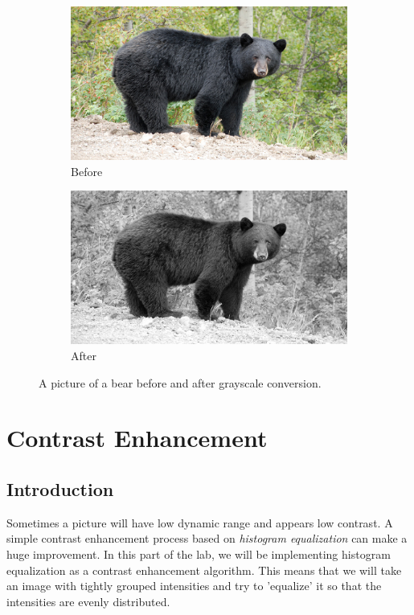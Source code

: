 \documentclass[11pt,a4paper]{article}
\begin{document}
\begin{figure}[ht]
	\centering
	\begin{subfigure}[h]{0.45\textwidth}
		\includegraphics[width=\textwidth]{images/test02}
		\caption{Before}
		\label{fig:gray2_bef}
	\end{subfigure}
	\begin{subfigure}[h]{0.45\textwidth}
		\includegraphics[width=\textwidth]{figs/test02_gray}
		\caption{After}
		\label{fig:gray2_aft}
	\end{subfigure}
	\caption{A picture of a bear before and after grayscale conversion.}
	\label{fig:gray2}
\end{figure}

\clearpage

\section{Contrast Enhancement}

\subsection{Introduction}
Sometimes a picture will have low dynamic range and appears low contrast. A simple contrast enhancement process based on \textit{histogram equalization} can make a huge improvement. In this part of the lab, we will be implementing histogram equalization as a contrast enhancement algorithm. This means that we will take an image with tightly grouped intensities and try to 'equalize' it so that the intensities are evenly distributed.
\end{document}

